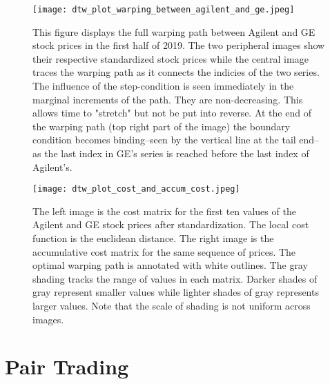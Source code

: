 \documentclass[12pt]{article}
\begin{document}
\begin{figure}
    \centering
    \texttt{[image: dtw\_plot\_warping\_between\_agilent\_and\_ge.jpeg]}
    \caption{This figure displays the full warping path between Agilent and GE stock prices in the first half of 2019. The two peripheral images show their respective standardized stock prices while the central image traces the warping path as it connects the indicies of the two series. The influence of the step-condition is seen immediately in the marginal increments of the path. They are non-decreasing. This allows time to "stretch" but not be put into reverse. At the end of the warping path (top right part of the image) the boundary condition becomes binding--seen by the vertical line at the tail end--as the last index in GE's series is reached before the last index of Agilent's.}
    \label{fig:dtw_plot_warping_between_agilent_and_ge}
\end{figure}

\begin{figure}
    \centering
    \texttt{[image: dtw\_plot\_cost\_and\_accum\_cost.jpeg]}
    \caption{The left image is the cost matrix for the first ten values of the Agilent and GE stock prices after standardization. The local cost function is the euclidean distance. The right image is the accumulative cost matrix for the same sequence of prices. The optimal warping path is annotated with white outlines. The gray shading tracks the range of values in each matrix. Darker shades of gray represent smaller values while lighter shades of gray represents larger values. Note that the scale of shading is not uniform across images.}
    \label{fig:dtw_plot_cost_and_accum_cost}
\end{figure}



\pagebreak


\section{Pair Trading} \label{sec:PairTrading}
\end{document}
